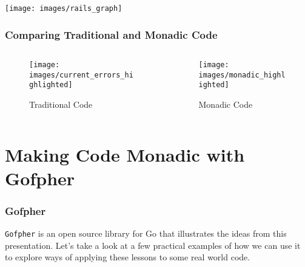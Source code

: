 \documentclass{beamer}
\begin{document}
\begin{frame}
  \begin{center}
    \texttt{[image: images/rails\_graph]}
  \end{center}
\end{frame}

\begin{frame}[fragile,t]
  \frametitle{Comparing Traditional and Monadic Code}
  \begin{columns}
    \begin{column}{.45\paperwidth}
      \begin{figure}
        \texttt{[image: images/current\_errors\_highlighted]}
        \caption{Traditional Code}
      \end{figure}
    \end{column}
    \begin{column}{.45\paperwidth}
      \begin{figure}
        \texttt{[image: images/monadic\_highlighted]}
        \caption{Monadic Code}
      \end{figure}
    \end{column}
  \end{columns}
\end{frame}

\section{Making Code Monadic with Gofpher}

\begin{frame}
  \frametitle{Gofpher}
  {\tt Gofpher} is an open source library for Go that illustrates the
  ideas from this presentation.  Let's take a look at a few practical
  examples of how we can use it to explore ways of applying these
  lessons to some real world code.
\end{frame}
\end{document}
